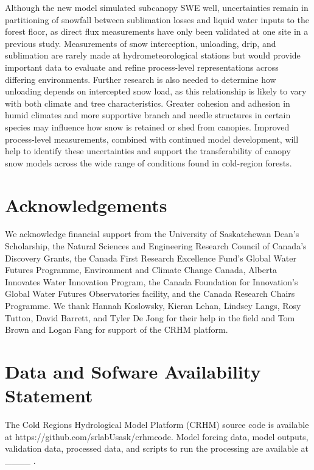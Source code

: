 \documentclass[
  letterpaper,
]{tex/uofsthesis-cs}
\begin{document}
Although the new model simulated subcanopy SWE well, uncertainties
remain in partitioning of snowfall between sublimation losses and liquid
water inputs to the forest floor, as direct flux measurements have only
been validated at one site in a previous study. Measurements of snow
interception, unloading, drip, and sublimation are rarely made at
hydrometeorological stations but would provide important data to
evaluate and refine process-level representations across differing
environments. Further research is also needed to determine how unloading
depends on intercepted snow load, as this relationship is likely to vary
with both climate and tree characteristics. Greater cohesion and
adhesion in humid climates and more supportive branch and needle
structures in certain species may influence how snow is retained or shed
from canopies. Improved process-level measurements, combined with
continued model development, will help to identify these uncertainties
and support the transferability of canopy snow models across the wide
range of conditions found in cold-region forests.

\section{Acknowledgements}\label{acknowledgements-1}

We acknowledge financial support from the University of Saskatchewan
Dean's Scholarship, the Natural Sciences and Engineering Research
Council of Canada's Discovery Grants, the Canada First Research
Excellence Fund's Global Water Futures Programme, Environment and
Climate Change Canada, Alberta Innovates Water Innovation Program, the
Canada Foundation for Innovation's Global Water Futures Observatories
facility, and the Canada Research Chairs Programme. We thank Hannah
Koslowsky, Kieran Lehan, Lindsey Langs, Rosy Tutton, David Barrett, and
Tyler De Jong for their help in the field and Tom Brown and Logan Fang
for support of the CRHM platform.

\section{Data and Sofware Availability
Statement}\label{data-and-sofware-availability-statement}

The Cold Regions Hydrological Model Platform (CRHM) source code is
available at https://github.com/srlabUsask/crhmcode. Model forcing data,
model outputs, validation data, processed data, and scripts to run the
processing are available at \_\_\_\_ .
\end{document}
